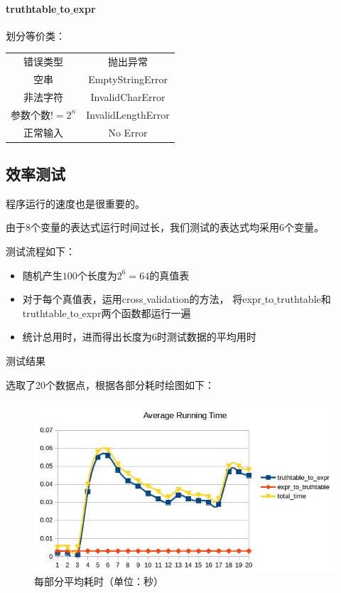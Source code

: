 	\paragraph{truthtable$\_$to$\_$expr\\}
		划分等价类：
		\begin{center}
			\begin{tabular}{cc}
				错误类型 & 抛出异常\\
				空串 & EmptyStringError\\
				非法字符 & InvalidCharError\\
				参数个数$!=2^n$ & InvalidLengthError\\
				正常输入 & No Error\\
		\end{tabular}				
		\end{center}

			
\subsection{效率测试}
	程序运行的速度也是很重要的。
	
	由于8个变量的表达式运行时间过长，我们测试的表达式均采用6个变量。
	
	测试流程如下：
		\begin{itemize}
			\item	随机产生$100$个长度为$2 ^ 6 = 64$的真值表
			\item	对于每个真值表，运用cross$\_$validation的方法，
					将expr$\_$to$\_$truthtable和truthtable$\_$to$\_$expr两个函数都运行一遍
			\item	统计总用时，进而得出长度为$6$时测试数据的平均用时
		\end{itemize}

		
	测试结果
	
	选取了20个数据点，根据各部分耗时绘图如下：
	\begin{figure}[h]
		\centering
			\includegraphics[scale=0.8]{images/speed.jpg}
			\caption{每部分平均耗时（单位：秒）}
	\end{figure}
	
